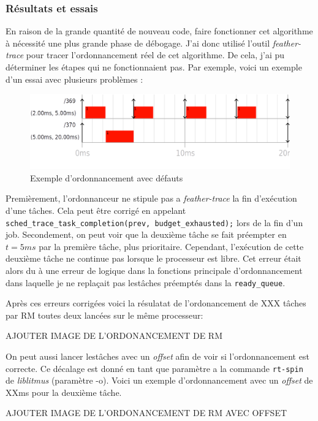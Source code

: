 \subsubsection{Résultats et essais}

En raison de la grande quantité de nouveau code, faire fonctionner cet algorithme à nécessité une plus grande phase de débogage. J'ai donc utilisé l'outil \textit{feather-trace} pour tracer l'ordonnancement réel de cet algorithme. De cela, j'ai pu déterminer les étapes qui ne fonctionnaient pas. Par exemple, voici un exemple d'un essai avec plusieurs problèmes : 
\begin{figure}[H]
    \centering
    \includegraphics[width=0.75\paperwidth]{Images/schedule_host=rock960_scheduler=DEMO_trace=notstoped.png}
    \caption{Exemple d'ordonnancement avec défauts}
\end{figure}

Premièrement, l’ordonnanceur ne stipule pas a \textit{feather-trace} la fin d'exécution d'une tâches. Cela peut être corrigé en  appelant \texttt{sched\_trace\_task\_completion(prev, budget\_exhausted);} lors de la fin d'un job.
Secondement, on peut voir que la deuxième tâche se fait préempter en $t=5ms$ par la première tâche, plus prioritaire. Cependant, l'exécution de cette deuxième tâche ne continue pas lorsque le processeur est libre. Cet erreur était alors du à une erreur de logique dans la fonctions principale d’ordonnancement dans laquelle je ne replaçait pas lestâches préemptés dans la \texttt{ready\_queue}.

Après ces erreurs corrigées voici la résulatat de l'ordonancement de \color{red}XXX \color{black} tâches par RM toutes deux lancées sur le même processeur:


\begin{center}
    \color{red} AJOUTER IMAGE DE L'ORDONANCEMENT DE RM
\end{center}

On peut aussi lancer lestâches avec un \textit{offset} afin de voir si l'ordonnancement est correcte. Ce décalage est donné en tant que paramètre a la commande \texttt{rt-spin} de \textit{liblitmus} (paramètre -o). Voici un exemple d'ordonnancement avec un \textit{offset} de XXms pour la deuxième tâche.
\begin{center}
    \color{red} AJOUTER IMAGE DE L'ORDONANCEMENT DE RM AVEC OFFSET
\end{center}

